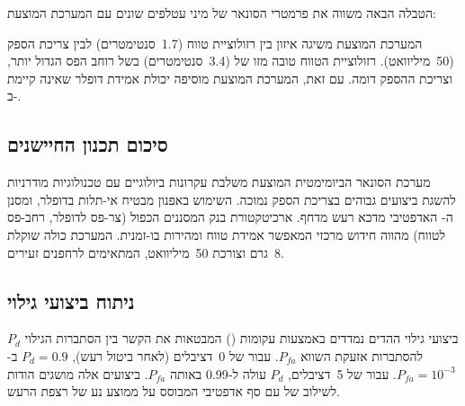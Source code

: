 הטבלה הבאה משווה את פרמטרי הסונאר של מיני עטלפים שונים עם המערכת המוצעת:

\begin{table}[htbp]
\centering
\caption{השוואת פרמטרי סונאר: תדר, רוחב פס, רזולוציית טווח, צריכת הספק. (Comparison of sonar parameters: frequency, bandwidth, range resolution, power consumption.)}
\label{tab:ch03_sonar_params}
\end{table}

המערכת המוצעת משיגה איזון בין רזולוציית טווח (1.7~סנטימטרים) לבין צריכת הספק (50~מיליוואט). רזולוציית הטווח טובה מזו של  (3.4~סנטימטרים) בשל רוחב הפס הגדול יותר, וצריכת ההספק דומה. עם זאת, המערכת המוצעת מוסיפה יכולת אמידת דופלר שאינה קיימת ב-.

\subsection{סיכום תכנון החיישנים}
\label{sec:sensor_summary}

מערכת הסונאר הביומימטית המוצעת משלבת עקרונות ביולוגיים עם טכנולוגיות  מודרניות להשגת ביצועים גבוהים בצריכת הספק נמוכה. השימוש באפנון  מבטיח אי-תלות בדופלר, ומסנן ה- האדפטיבי מדכא רעש מדחף. ארכיטקטורת בנק המסננים הכפול (צר-פס לדופלר, רחב-פס לטווח) מהווה חידוש מרכזי המאפשר אמידת טווח ומהירות בו-זמנית. המערכת כולה שוקלת 8~גרם וצורכת 50~מיליוואט, המתאימים לרחפנים זעירים.

\subsection{ניתוח ביצועי גילוי}
\label{sec:detection_performance}

ביצועי גילוי ההדים נמדדים באמצעות עקומות  () המבטאות את הקשר בין הסתברות הגילוי $P_d$ להסתברות אזעקת השווא $P_{fa}$. עבור  של 0~דציבלים (לאחר ביטול רעש), $P_d = 0.9$ ב-$P_{fa} = 10^{-3}$. עבור  של 5~דציבלים, $P_d$ עולה ל-0.99 באותה $P_{fa}$. ביצועים אלה מושגים הודות לשילוב של  עם סף אדפטיבי המבוסס על ממוצע נע של רצפת הרעש.

